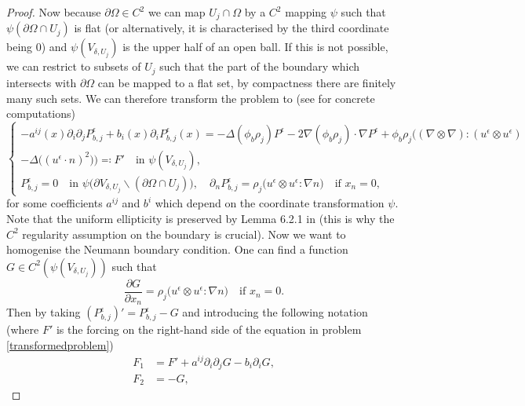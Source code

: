 \documentclass[12pt,a4paper]{article}
\theoremstyle{definition}
\theoremstyle{remark}
\numberwithin{equation}{section}
\begin{document}
\begin{appendices}
\begin{proof}
Now because $\partial \Omega \in C^2$ we can map $U_j \cap \Omega$ by a $C^2$ mapping $\psi$ such that $\psi (\partial \Omega \cap U_j)$ is flat (or alternatively, it is characterised by the third coordinate being 0) and $\psi (V_{\delta,U_j})$ is the upper half of an open ball. If this is not possible, we can restrict to subsets of $U_j$ such that the part of the boundary which intersects with $\partial \Omega$ can be mapped to a flat set, by compactness there are finitely many such sets. We can therefore transform the problem to (see \cite[~Section 6.2]{krylov} for concrete computations)
\begingroup
\allowdisplaybreaks
\begin{equation} \label{transformedproblem}
\begin{cases}
- a^{ij} (x) \partial_i  \partial_j P^\epsilon_{b,j} + b_i (x) \partial_i P^\epsilon_{b,j} (x) = - \Delta (\phi_b \rho_j) P^\epsilon - 2  \nabla (\phi_b \rho_j) \cdot \nabla P^\epsilon + \phi_b \rho_j \bigg((\nabla \otimes \nabla) : (u^\epsilon \otimes u^\epsilon) \\
- \Delta \big( (u^\epsilon \cdot n)^2 \big)  \bigg) \eqqcolon F' \quad \text{in } \psi(V_{\delta,U_j}) , \\
P^\epsilon_{b,j} = 0 \quad \text{in } \psi \big(\partial V_{\delta, U_j} \backslash (\partial \Omega \cap U_j) \big), \quad \partial_n P^\epsilon_{b,j} = \rho_j \big( u^\epsilon \otimes u^\epsilon : \nabla n \big) \quad \text{if } x_n = 0,
\end{cases}
\end{equation}
\endgroup
for some coefficients $a^{ij}$ and $b^i$ which depend on the coordinate transformation $\psi$. Note that the uniform ellipticity is preserved by Lemma 6.2.1 in \cite{krylov} (this is why the $C^2$ regularity assumption on the boundary is crucial). 
Now we want to homogenise the Neumann boundary condition. One can find a function $G \in C^2 (\psi (V_{\delta, U_j}))$ such that
\begin{equation*}
\frac{\partial G}{\partial x_n} = \rho_j \big( u^\epsilon \otimes u^\epsilon : \nabla n \big) \quad \text{if } x_n = 0.
\end{equation*}
Then by taking $(P^\epsilon_{b,j})' = P^\epsilon_{b,j} - G$  and introducing the following notation (where $F'$ is the forcing on the right-hand side of the equation in problem \ref{transformedproblem})
\begin{align*}
F_1 &= F' + a^{ij} \partial_i \partial_j G - b_i \partial_i G, \\
F_2 &= - G,
\end{align*}

\end{proof}
\end{appendices}
\end{document}
